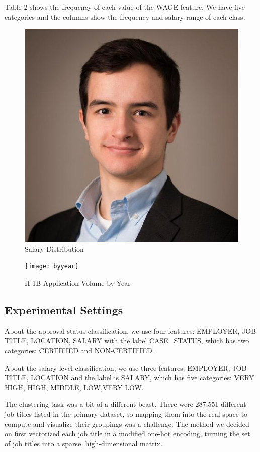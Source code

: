 \documentclass[sigconf]{acmart}
\begin{document}
Table 2 shows the frequency of each value of the WAGE feature. We have five categories and the
columns show the frequency and salary range of each class.

\begin{figure}[h]
  \centering
  \includegraphics[scale=.4]{figure1.png}
  \caption{Salary Distribution}\label{fig:digit}
\end{figure}


\begin{figure}[h]
  \centering
  \texttt{[image: byyear]}
  \caption{H-1B Application Volume by Year}
\end{figure}


\subsection{Experimental Settings}
About the approval status classification, we use four features: EMPLOYER, JOB TITLE, LOCATION,
SALARY with the label CASE\_STATUS, which has two categories: CERTIFIED and NON-CERTIFIED.

About the salary level classification, we use three features: EMPLOYER, JOB TITLE, LOCATION and the
label is SALARY, which has five categories: VERY HIGH, HIGH, MIDDLE, LOW,VERY LOW.

The clustering task was a bit of a different beast. There were 287,551 different job titles listed
in the primary dataset, so mapping them into the real space to compute and visualize their groupings
was a challenge. The method we decided on first vectorized each job title in a modified one-hot
encoding, turning the set of job titles into a sparse, high-dimensional matrix.
\end{document}
